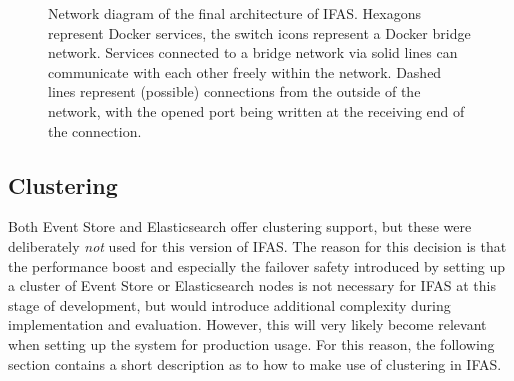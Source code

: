 \begin{figure}[ht]
\caption[Network diagram of the final architecture of \ac{IFAS}.]{
	Network diagram of the final architecture of \ac{IFAS}.
        Hexagons represent Docker services, the switch icons represent a Docker bridge network.
        Services connected to a bridge network via solid lines can communicate with each other freely within the network.
        Dashed lines represent (possible) connections from the outside of the network, with the opened port being written at the receiving end of the connection.}
        \label{figure:implementation:orchestration:network}
\end{figure}

\subsection{Clustering}
\label{sec:implementation:orchestration:clustering}

Both Event Store and Elasticsearch offer clustering support, but these were deliberately \emph{not} used for this version of \ac{IFAS}.
The reason for this decision is that the performance boost and especially the failover safety introduced by setting up a cluster of Event Store or Elasticsearch nodes is not necessary for \ac{IFAS} at this stage of development, but would introduce additional complexity during implementation and evaluation.
However, this will very likely become relevant when setting up the system for production usage.
For this reason, the following section contains a short description as to how to make use of clustering in \ac{IFAS}.

